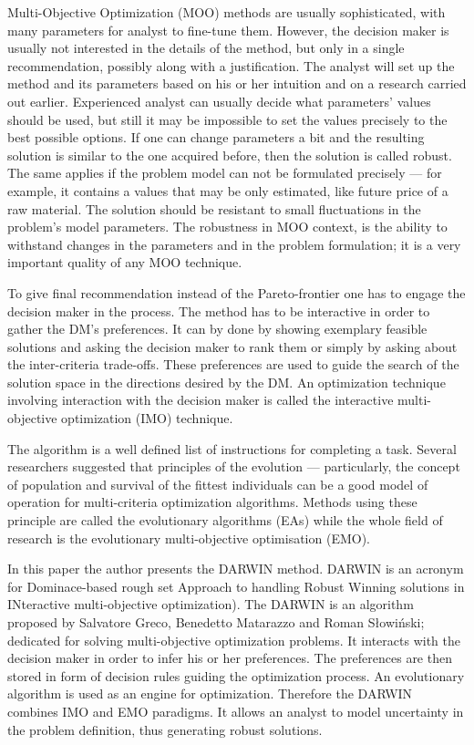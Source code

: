 Multi-Objective Optimization (MOO) methods are usually sophisticated, with
many parameters for analyst to fine-tune them. However, the decision maker is
usually not interested in the details of the method, but only in a single
recommendation, possibly along with a justification. The analyst will set up
the method and its parameters based on his or her intuition and on a research
carried out earlier. Experienced analyst can usually decide what parameters'
values should be used, but still it may be impossible to set the values
precisely to the best possible options. If one can change parameters a bit and
the resulting solution is similar to the one acquired before, then the
solution is called robust. The same applies if the problem model can not be
formulated precisely --- for example, it contains a values that may be only
estimated, like future price of a raw material. The solution should be
resistant to small fluctuations in the problem's model parameters. The
robustness in MOO context, is the ability to withstand changes in the
parameters and in the problem formulation; it is a very important quality of
any MOO technique.

To give final recommendation instead of the Pareto-frontier one has to engage
the decision maker in the process. The method has to be interactive in order
to gather the DM's preferences. It can by done by showing exemplary feasible
solutions and asking the decision maker to rank them or simply by asking about
the inter-criteria trade-offs. These preferences are used to guide the search
of the solution space in the directions desired by the DM. An optimization
technique involving interaction with the decision maker is called the
interactive multi-objective optimization (IMO) technique.

The algorithm is a well defined list of instructions for completing a
task. Several researchers suggested that principles of the evolution ---
particularly, the concept of population and survival of the fittest
individuals can be a good model of operation for multi-criteria optimization
algorithms. Methods using these principle are called the evolutionary
algorithms (EAs) while the whole field of research is the evolutionary
multi-objective optimisation (EMO).

In this paper the author presents the DARWIN method. DARWIN is an acronym for
Dominace-based rough set Approach to handling Robust Winning solutions in
INteractive multi-objective optimization). The DARWIN is an algorithm proposed
by Salvatore Greco, Benedetto Matarazzo and Roman Słowiński; dedicated for
solving multi-objective optimization problems. It interacts with the decision
maker in order to infer his or her preferences. The preferences are then
stored in form of decision rules guiding the optimization process. An
evolutionary algorithm is used as an engine for optimization. Therefore the
DARWIN combines IMO and EMO paradigms. It allows an analyst to model
uncertainty in the problem definition, thus generating robust solutions.

